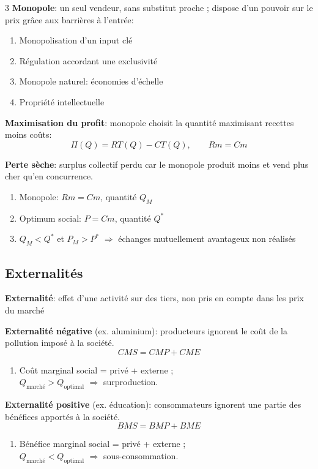 \documentclass[12pt, a4paper]{article}
\begin{document}
\begin{multicols*}{3}
\textbf{Monopole}: un seul vendeur, sans substitut proche ; dispose d'un pouvoir sur le prix grâce aux barrières à l'entrée:
\begin{enumerate}[\roman*.]
  \item Monopolisation d'un input clé 
  \item Régulation accordant une exclusivité
  \item Monopole naturel: économies d'échelle
  \item Propriété intellectuelle
\end{enumerate}

\textbf{Maximisation du profit}: monopole choisit la quantité maximisant recettes moins coûts:
\[
\Pi(Q)=RT(Q)-CT(Q),\qquad \boxed{Rm=Cm}
\]

\begin{center}
\end{center}

\textbf{Perte sèche}: surplus collectif perdu car le monopole produit moins et vend plus cher qu'en concurrence.
\begin{enumerate}[\roman*.]
  \item Monopole: $Rm=Cm$, quantité $Q_M$
  \item Optimum social: $P=Cm$, quantité $Q^*$
  \item $Q_M<Q^*$ et $P_M>P^*$ $\Rightarrow$ échanges mutuellement avantageux non réalisés
\end{enumerate}

\colbreak

\subsection{Externalités}

\textbf{Externalité}: effet d'une activité sur des tiers, non pris en compte dans les prix du marché

\textbf{Externalité négative} (ex. aluminium): producteurs ignorent le coût de la pollution imposé à la société.
\[
\boxed{CMS=CMP+CME}
\]
\begin{enumerate}[\roman*.]
  \item Coût marginal social = privé + externe ;\\ $Q_{\text{marché}}>Q_{\text{optimal}}$ $\Rightarrow$ surproduction.
\end{enumerate}

\textbf{Externalité positive} (ex. éducation): consommateurs ignorent une partie des bénéfices apportés à la société.
\[
\boxed{BMS=BMP+BME}
\]
\begin{enumerate}[\roman*.]
  \item Bénéfice marginal social = privé + externe ;\\ $Q_{\text{marché}}<Q_{\text{optimal}}$ $\Rightarrow$ sous-consommation.
\end{enumerate}


\end{multicols*}
\end{document}

